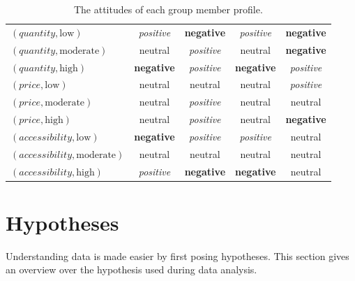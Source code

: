 \begin{table}
\begin{center}
\begin{tabular}{l|c|c|c|c}
            $(\textit{quantity}, \text{low})$           & \textit{positive} & \textbf{negative} & \textit{positive} & \textbf{negative} \\
            $(\textit{quantity}, \text{moderate})$      & neutral           & \textit{positive} & neutral           & \textbf{negative} \\
            $(\textit{quantity}, \text{high})$          & \textbf{negative} & \textit{positive} & \textbf{negative} & \textit{positive} \\
            \hline
            $(\textit{price}, \text{low})$              & neutral           & neutral           & neutral           & \textit{positive} \\
            $(\textit{price}, \text{moderate})$         & neutral           & \textit{positive} & neutral           & neutral           \\
            $(\textit{price}, \text{high})$             & neutral           & \textit{positive} & neutral           & \textbf{negative} \\
            \hline
            $(\textit{accessibility}, \text{low})$      & \textbf{negative} & \textit{positive} & \textit{positive} & neutral           \\
            $(\textit{accessibility}, \text{moderate})$ & neutral           & neutral           & neutral           & neutral           \\
            $(\textit{accessibility}, \text{high})$     & \textit{positive} & \textbf{negative} & \textbf{negative} & neutral           \\
            \hline
        \end{tabular}
        \caption{ The attitudes of each group member profile. }
        \label{tab:Evaluation:GroupMemberMappings}
    \end{center}
\end{table}


\section{Hypotheses}
\label{sec:Evaluation:Hypotheses}

Understanding data is made easier by first posing hypotheses. This section gives an overview over the hypothesis used during data analysis.


